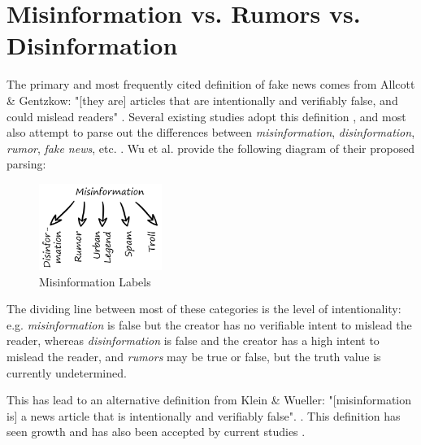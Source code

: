 \documentclass[NETN,manuscript]{stjour-new}
\begin{document}
\section{Misinformation vs. Rumors vs. Disinformation}
\label{disinformation}
The primary and most frequently cited definition of fake news comes from Allcott \& Gentzkow: "[they are] articles that are intentionally and verifiably false, and could mislead readers" \citep{allcott2017social}. Several existing studies adopt this definition \citep{conroy2015automatic,klein2017fake,rubin2015deception,rubin2017deception,mustafaraj2017fake,potthast2017stylometric}, and most also attempt to parse out the differences between \textit{misinformation}, \textit{disinformation}, \textit{rumor}, \textit{fake news}, etc. \citep{zimdars2020fake,  difonzo2007rumor,flynn2017nature,garrett2013undermining,wu2016mining}. Wu et al. provide the following diagram of their proposed parsing:
 \begin{figure}[htp]
    \centering
    \includegraphics[width=4cm]{misinformation graphic.png}
    \caption{Misinformation Labels \citep{wu2016mining}}
    \label{fig:misinformation graphic.png}
\end{figure}


The dividing line between most of these categories is the level of intentionality: e.g. \textit{misinformation} is false but the creator has no verifiable  intent to mislead the reader, whereas \textit{disinformation} is false and the creator has a high intent to mislead the reader, and \textit{rumors} may be true or false, but the truth value is currently undetermined.

This has lead to an alternative definition from Klein \& Wueller: "[misinformation is] a news article that is intentionally and verifiably false". \citep{klein2017fake}. This definition has seen growth and has also been accepted by current studies \citep{shu2017fake, liu2018early}.
\end{document}
